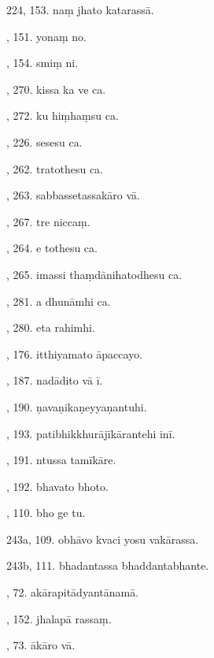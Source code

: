 224, 153. naṃ jhato katarassā.\hfill \pageref{sut:224}\par {}, 151. yonaṃ no.\hfill \pageref{sut:225}\par {}, 154. smiṃ ni.\hfill \pageref{sut:226}\par {}, 270. kissa ka ve ca.\hfill \pageref{sut:227}\par {}, 272. ku hiṃhaṃsu ca.\hfill \pageref{sut:228}\par {}, 226. sesesu ca.\hfill \pageref{sut:229}\par {}, 262. tratothesu ca.\hfill \pageref{sut:230}\par {}, 263. sabbassetassakāro vā.\hfill \pageref{sut:231}\par {}, 267. tre niccaṃ.\hfill \pageref{sut:232}\par {}, 264. e tothesu ca.\hfill \pageref{sut:233}\par {}, 265. imassi thaṃdānihatodhesu ca.\hfill \pageref{sut:234}\par {}, 281. a dhunāmhi ca.\hfill \pageref{sut:235}\par {}, 280. eta rahimhi.\hfill \pageref{sut:236}\par {}, 176. itthiyamato āpaccayo.\hfill \pageref{sut:237}\par {}, 187. nadādito vā ī.\hfill \pageref{sut:238}\par {}, 190. ṇavaṇikaṇeyyaṇantuhi.\hfill \pageref{sut:239}\par {}, 193. patibhikkhurājīkārantehi inī.\hfill \pageref{sut:240}\par {}, 191. ntussa tamīkāre.\hfill \pageref{sut:241}\par {}, 192. bhavato bhoto.\hfill \pageref{sut:242}\par {}, 110. bho ge tu.\hfill \pageref{sut:243}\par \noindent
243a, 109. obhāvo kvaci yosu vakārassa.\hfill \pageref{sut:243a}\par \noindent
243b, 111. bhadantassa bhaddantabhante.\hfill \pageref{sut:243b}\par {}, 72. akārapitādyantānamā.\hfill \pageref{sut:244}\par {}, 152. jhalapā rassaṃ.\hfill \pageref{sut:245}\par {}, 73. ākāro vā.\hfill \pageref{sut:246}\par \noindent
